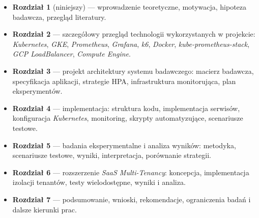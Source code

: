 \begin{itemize}
  \item \textbf{Rozdział 1} (niniejszy) — wprowadzenie teoretyczne, motywacja, hipoteza badawcza, przegląd literatury.
  \item \textbf{Rozdział 2} — szczegółowy przegląd technologii wykorzystanych w projekcie: \textit{Kubernetes}, \textit{GKE}, \textit{Prometheus}, \textit{Grafana}, \textit{k6}, \textit{Docker}, \textit{kube-prometheus-stack}, \textit{GCP LoadBalancer}, \textit{Compute Engine}.
  \item \textbf{Rozdział 3} — projekt architektury systemu badawczego: macierz badawcza, specyfikacja aplikacji, strategie HPA, infrastruktura monitorująca, plan eksperymentów.
  \item \textbf{Rozdział 4} — implementacja: struktura kodu, implementacja serwisów, konfiguracja \textit{Kubernetes}, monitoring, skrypty automatyzujące, scenariusze testowe.
  \item \textbf{Rozdział 5} — badania eksperymentalne i analiza wyników: metodyka, scenariusze testowe, wyniki, interpretacja, porównanie strategii.
  \item \textbf{Rozdział 6} — rozszerzenie \textit{SaaS Multi-Tenancy}: koncepcja, implementacja izolacji tenantów, testy wielodostępne, wyniki i analiza.
  \item \textbf{Rozdział 7} — podsumowanie, wnioski, rekomendacje, ograniczenia badań i dalsze kierunki prac.
\end{itemize}
